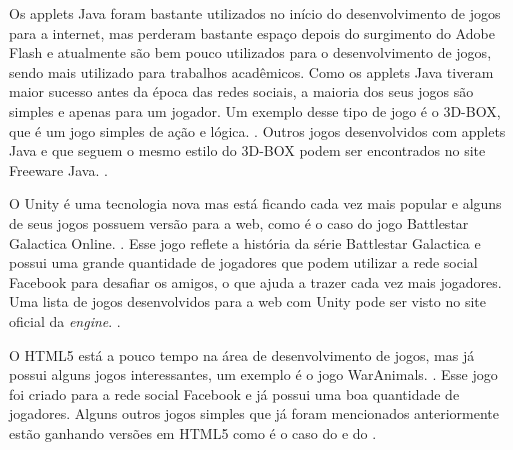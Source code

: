 Os applets Java foram bastante utilizados no início do desenvolvimento
de jogos para a internet, mas perderam
bastante espaço depois do surgimento do Adobe Flash e atualmente
são bem pouco utilizados para o desenvolvimento de
jogos, sendo mais utilizado para trabalhos acadêmicos.
Como os applets Java tiveram maior sucesso antes da época das redes
sociais, a maioria dos seus jogos são simples e apenas para um
jogador. Um exemplo desse tipo de jogo é o 3D-BOX,
que é um jogo simples de ação e lógica. \cite{website:3dbox}.
Outros jogos desenvolvidos com applets Java e que seguem o mesmo estilo do 3D-BOX
podem ser encontrados no site Freeware Java. \cite{website:freewarejava}.

O Unity é uma tecnologia nova mas está ficando cada vez mais popular e alguns de seus jogos
possuem versão para a web, como é o caso do jogo Battlestar Galactica
Online. \cite{website:unitybattlestargalactica}. Esse jogo reflete a
história da série Battlestar Galactica e possui uma grande quantidade
de jogadores que podem utilizar a rede social Facebook para desafiar
os amigos, o que ajuda a trazer cada vez mais jogadores.
Uma lista de jogos desenvolvidos para a web com Unity pode ser visto
no site oficial da \textit{engine}. \cite{website:unity3dwebgames}.

O HTML5 está a pouco tempo na área de desenvolvimento de jogos, mas já
possui alguns jogos interessantes, um exemplo é o jogo
WarAnimals. \cite{website:waranimals}. Esse jogo foi criado para a rede social
Facebook e já possui uma boa quantidade de jogadores. Alguns outros
jogos simples que já foram mencionados anteriormente estão ganhando versões em HTML5
como é o caso do  e do
.
